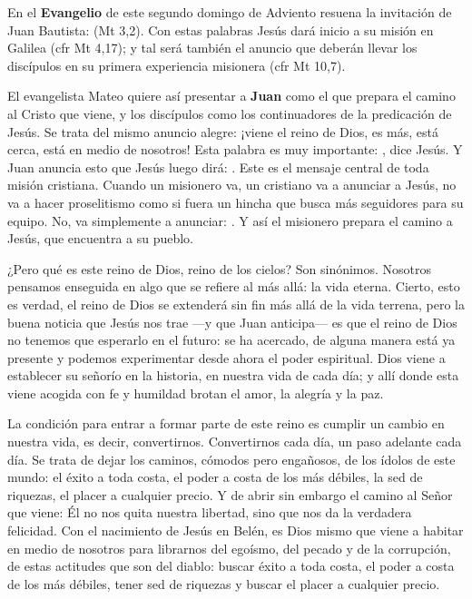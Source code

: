 \begin{body}	
	En el \textbf{Evangelio} de este segundo domingo de Adviento resuena la invitación de Juan Bautista:  (Mt 3,2). Con estas palabras Jesús dará inicio a su misión en Galilea (cfr Mt 4,17); y tal será también el anuncio que deberán llevar los discípulos en su primera experiencia misionera (cfr Mt 10,7).
	
	El evangelista Mateo quiere así presentar a \textbf{Juan} como el que prepara el camino al Cristo que viene, y los discípulos como los continuadores de la predicación de Jesús. Se trata del mismo anuncio alegre: ¡viene el reino de Dios, es más, está cerca, está en medio de nosotros! Esta palabra es muy importante: , dice Jesús. Y Juan anuncia esto que Jesús luego dirá: . Este es el mensaje central de toda misión cristiana. Cuando un misionero va, un cristiano va a anunciar a Jesús, no va a hacer proselitismo como si fuera un hincha que busca más seguidores para su equipo. No, va simplemente a anunciar: . Y así el misionero prepara el camino a Jesús, que encuentra a su pueblo.
	
	¿Pero qué es este reino de Dios, reino de los cielos? Son sinónimos. Nosotros pensamos enseguida en algo que se refiere al más allá: la vida eterna. Cierto, esto es verdad, el reino de Dios se extenderá sin fin más allá de la vida terrena, pero la buena noticia que Jesús nos trae ---y que Juan anticipa--- es que el reino de Dios no tenemos que esperarlo en el futuro: se ha acercado, de alguna manera está ya presente y podemos experimentar desde ahora el poder espiritual. Dios viene a establecer su señorío en la historia, en nuestra vida de cada día; y allí donde esta viene acogida con fe y humildad brotan el amor, la alegría y la paz.
	
	La condición para entrar a formar parte de este reino es cumplir un cambio en nuestra vida, es decir, convertirnos. Convertirnos cada día, un paso adelante cada día. Se trata de dejar los caminos, cómodos pero engañosos, de los ídolos de este mundo: el éxito a toda costa, el poder a costa de los más débiles, la sed de riquezas, el placer a cualquier precio. Y de abrir sin embargo el camino al Señor que viene: Él no nos quita nuestra libertad, sino que nos da la verdadera felicidad. Con el nacimiento de Jesús en Belén, es Dios mismo que viene a habitar en medio de nosotros para librarnos del egoísmo, del pecado y de la corrupción, de estas actitudes que son del diablo: buscar éxito a toda costa, el poder a costa de los más débiles, tener sed de riquezas y buscar el placer a cualquier precio.
	

\end{body}
